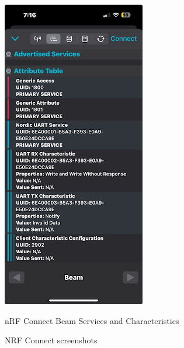 \begin{figure}[H]
\begin{minipage}{0.32\textwidth}
		\includegraphics[width=0.8\linewidth]{nrfconnect3}
		\caption{nRF Connect Beam Services and Characteristics}
		\label{fig:nrfconnect3}
	\end{minipage}
	
	\caption{NRF Connect screenshots}
	\label{fig:nrfconnect_all}
\end{figure}

